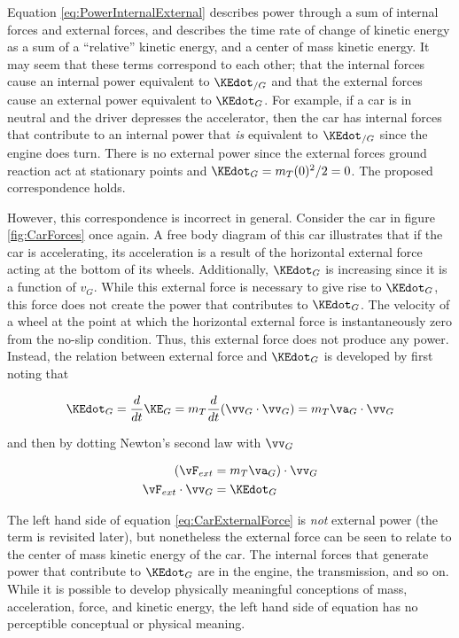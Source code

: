 Equation \ref{eq:PowerInternalExternal} describes power through a sum of internal forces and external forces, and describes the time rate of change of kinetic energy as a sum of a ``relative'' kinetic energy, and a center of mass kinetic energy. It may seem that these terms correspond to each other; that the internal forces cause an internal power equivalent to $\KEdot_{/G}$ and that the external forces cause an external power equivalent to $\KEdot_{G}$. For example, if a car is in neutral and the driver depresses the accelerator, then the car has internal forces that contribute to an internal power that \textit{is} equivalent to $\KEdot_{/G}$ since the engine does turn. There is no external power since the external forces ground reaction act at stationary points and $\KEdot_{G} = m_{T}(0)^2/2 = 0$. The proposed correspondence holds.

However, this correspondence is incorrect in general. Consider the car in figure \ref{fig:CarForces} once again. A free body diagram of this car illustrates that if the car is accelerating, its acceleration is a result of the horizontal external force acting at the bottom of its wheels. Additionally, $\KEdot_{G}$ is increasing since it is a function of $v_{G}$. While this external force is necessary to give rise to $\KEdot_{G}$, this force does not create the power that contributes to $\KEdot_{G}$. The velocity of a wheel at the point at which the horizontal external force is instantaneously zero from the no-slip condition. Thus, this external force does not produce any power. Instead, the relation between external force and $\KEdot_{G}$ is developed by first noting that 

\begin{equation}
\KEdot_{G} = \frac{d}{dt} \KE_{G} = m_{T}  \frac{d}{dt} (\vv_{G} \cdot \vv_{G}) = m_{T} \va_{G} \cdot \vv_{G}
\end{equation}

and then by dotting Newton's second law with $\vv_{G}$

\begin{align}
( \vF_{ext} &= m_{T} \va_{G} ) \cdot \vv_{G} \\
\vF_{ext} \cdot \vv_{G} &= \KEdot_{G} \label{eq:CarExternalForce}
\end{align}

The left hand side of equation \ref{eq:CarExternalForce} is \emph{not} external power (the term is revisited later), but nonetheless the external force can be seen to relate to the center of mass kinetic energy of the car. The internal forces that generate power that contribute to $\KEdot_{G}$ are in the engine, the transmission, and so on. While it is possible to develop physically meaningful conceptions of mass, acceleration, force, and kinetic energy, the left hand side of equation \label{eq:CarExternalForce} has no perceptible conceptual or physical meaning.

